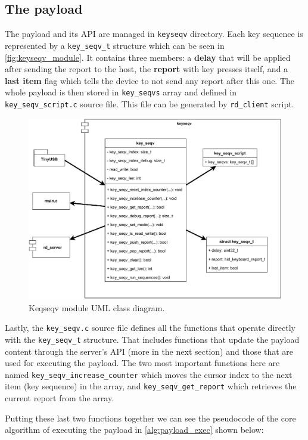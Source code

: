 \subsection{The payload}
\label{thePayload}
The payload and its API are managed in \verb|keyseqv| directory. Each key sequence is represented by a \verb|key_seqv_t| structure which can be seen in \autoref{fig:keyseqv_module}. It contains three members: a \textbf{delay} that will be applied after sending the report to the host, the \textbf{report} with key presses itself, and a \textbf{last item} flag which tells the device to not send any report after this one. The whole payload is then stored in \verb|key_seqvs| array and defined in \verb|key_seqv_script.c| source file. This file can be generated by \verb|rd_client| script.
\begin{figure}[ht]
    \centering
    \includegraphics[width=0.8\linewidth]{./obrazky-figures/keyseqv_module.pdf}
    \caption{Keqseqv module UML class diagram.}
    \label{fig:keyseqv_module}
\end{figure}

Lastly, the \verb|key_seqv.c| source file defines all the functions that operate directly with the \verb|key_seqv_t| structure. That includes functions that update the payload content through the server's API (more in the next section) and those that are used for executing the payload. The two most important functions here are named \verb|key_seqv_increase_counter| \linebreak which moves the cursor index to the next item (key sequence) in the array, and \linebreak\verb|key_seqv_get_report| which retrieves the current report from the array.

Putting these last two functions together we can see the pseudocode of the core algorithm of executing the payload in \autoref{alg:payload_exec} shown below:

